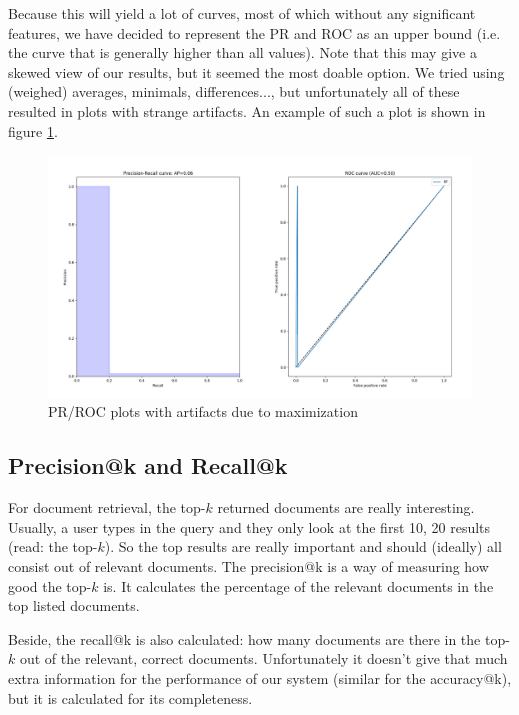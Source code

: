 \documentclass[11pt]{article}
\begin{document}
Because this will yield a lot of curves, most of which without any significant features, we have decided to represent the PR and ROC as an upper bound (i.e. the curve that is generally higher than all values). Note that this may give a skewed view of our results, but it seemed the most doable option. We tried using (weighed) averages, minimals, differences..., but unfortunately all of these resulted in plots with strange artifacts. An example of such a plot is shown in figure \ref{fig:artifact}.

\begin{figure}[htp]
	\centering
	\includegraphics[width=\textwidth]{images/artifact}
	\caption{PR/ROC plots with artifacts due to maximization}
	\label{fig:artifact}
\end{figure}

\subsection{\textsf{Precision@k} and \textsf{Recall@k}}
For document retrieval, the top-$k$ returned documents are really interesting. Usually, a user types in the query and they only look at the first 10, 20 results (read: the top-$k$). So the top results are really important and should (ideally) all consist out of relevant documents. The \textsf{precision@k} is a way of measuring how good the top-$k$ is. It calculates the percentage of the relevant documents in the top listed documents.

Beside, the \textsf{recall@k} is also calculated: how many documents are there in the top-$k$ out of the relevant, correct documents. Unfortunately it doesn't give that much extra information for the performance of our system (similar for the \textsf{accuracy@k}), but it is calculated for its completeness. 
\end{document}
